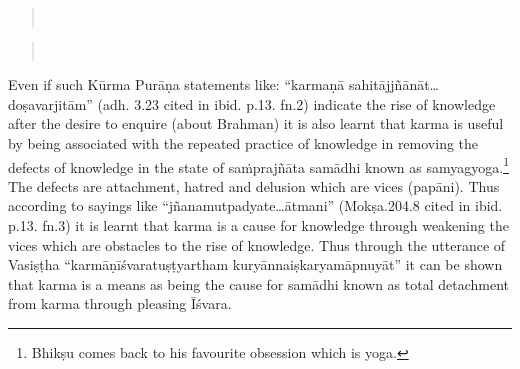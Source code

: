 
\begin{verse}
\\
\end{verse}
\begin{verse}
\\
\end{verse}

Even if such Kūrma Purāṇa statements like: “karmaṇā sahitājjñānāt…\-doṣavarjitām” (adh. 3.23 cited in ibid. p.13. fn.2) indicate the rise of knowledge after the desire to enquire (about Brahman) it is also learnt that karma is useful by being associated with the repeated practice of knowledge in removing the defects of knowledge in the state of saṁprajñāta samādhi known as samyagyoga.\footnote{Bhikṣu comes back to his favourite obsession which is yoga.} The defects are attachment, hatred and delusion which are vices (papāni). Thus according to sayings like “jñanamutpadyate…ātmani” (Mokṣa.204.8 cited in ibid. p.13. fn.3) it is learnt that karma is a cause for knowledge through weakening the vices which are obstacles to the rise of knowledge. Thus through the utterance of Vasiṣṭha “karmāṇīśvaratuṣṭyartham kuryānnaiṣkaryamāpnuyāt” it can be shown that karma is a means as being the cause for samādhi known as total detachment from karma through pleasing Īśvara.

